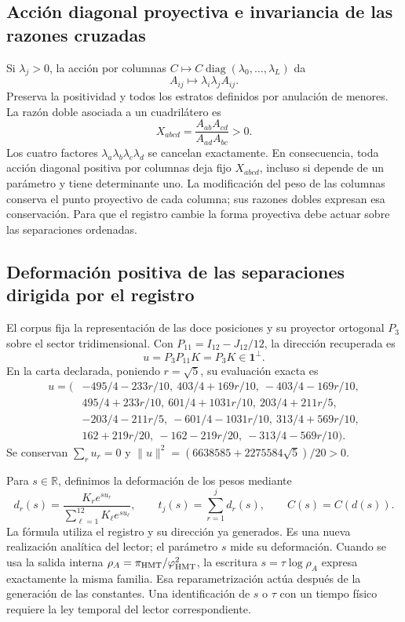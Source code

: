 \subsection{Acción diagonal proyectiva e invariancia de las razones cruzadas}

Si \(\lambda_j>0\), la acción por columnas
\(C\mapsto C\operatorname{diag}(\lambda_0,\ldots,\lambda_L)\) da
\[
 A_{ij}\longmapsto\lambda_i\lambda_j A_{ij}.
\]
Preserva la positividad y todos los estratos definidos por anulación de
menores. La razón doble asociada a un cuadrilátero es
\begin{equation}
 X_{abcd}=\frac{A_{ab}A_{cd}}{A_{ad}A_{bc}}>0.
 \label{eq:nc-crossratio}
\end{equation}
Los cuatro factores \(\lambda_a\lambda_b\lambda_c\lambda_d\) se
cancelan exactamente. En consecuencia, toda acción diagonal positiva por
columnas deja fijo \(X_{abcd}\), incluso si depende de un parámetro y
tiene determinante uno. La modificación del peso de las columnas conserva
el punto proyectivo de cada columna; sus razones dobles expresan esa
conservación. Para que el registro cambie la forma proyectiva debe actuar
sobre las separaciones ordenadas.

\subsection{Deformación positiva de las separaciones dirigida por el registro}

El corpus fija la representación de las doce posiciones y su proyector
ortogonal \(P_3\) sobre el sector tridimensional. Con
\(P_{11}=I_{12}-J_{12}/12\), la dirección recuperada es
\[
 u=P_3P_{11}K=P_3K\in\mathbf1^\perp.
\]
En la carta declarada, poniendo \(r=\sqrt5\), su evaluación exacta es
\begin{align*}
u=(&-495/4-233r/10,\ 403/4+169r/10,\ -403/4-169r/10,\\
   &495/4+233r/10,\ 601/4+1031r/10,\ 203/4+211r/5,\\
   &-203/4-211r/5,\ -601/4-1031r/10,\ 313/4+569r/10,\\
   &162+219r/20,\ -162-219r/20,\ -313/4-569r/10).
\end{align*}
Se conservan \(\sum_ru_r=0\) y
\(\|u\|^2=(6638585+2275584\sqrt5)/20>0\).

Para \(s\in\mathbb R\), definimos la deformación de los pesos mediante
\begin{equation}
 d_r(s)=\frac{K_re^{su_r}}{\sum_{\ell=1}^{12}K_\ell e^{su_\ell}},
 \qquad t_j(s)=\sum_{r=1}^jd_r(s),\qquad C(s)=C(d(s)).
 \label{eq:nc-gap-flow}
\end{equation}
La fórmula utiliza el registro y su dirección ya generados. Es una nueva
realización analítica del lector; el parámetro \(s\) mide su deformación.
Cuando se usa la salida interna \(\rho_A=\pi_{\rm HMT}/\varphi_{\rm HMT}^2\),
la escritura \(s=\tau\log\rho_A\) expresa exactamente la misma familia.
Esa reparametrización actúa después de la generación de las constantes.
Una identificación de \(s\) o \(\tau\) con un tiempo físico requiere la
ley temporal del lector correspondiente.

